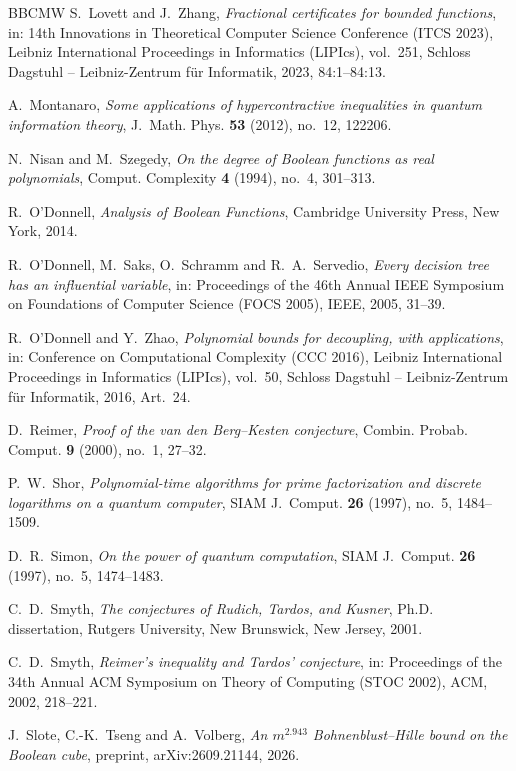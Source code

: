 \documentclass[11pt,reqno]{amsart}
\theoremstyle{definition}
\theoremstyle{remark}
\numberwithin{equation}{section}
\theoremstyle{named}
\theoremstyle{plain}
\begin{document}
\begin{thebibliography}{BBCMW}
 S.~Lovett and J.~Zhang, \emph{Fractional certificates for bounded functions}, in:
14th Innovations in Theoretical Computer Science Conference (ITCS 2023), Leibniz International
Proceedings in Informatics (LIPIcs), vol.~251, Schloss Dagstuhl -- Leibniz-Zentrum f\"ur Informatik,
2023, 84:1--84:13.

 A.~Montanaro, \emph{Some applications of hypercontractive inequalities in quantum
information theory}, J.~Math. Phys. \textbf{53} (2012), no.~12, 122206.

 N.~Nisan and M.~Szegedy, \emph{On the degree of Boolean functions as real
polynomials}, Comput. Complexity \textbf{4} (1994), no.~4, 301--313.

 R.~O'Donnell, \emph{Analysis of Boolean Functions}, Cambridge University Press,
New York, 2014.

 R.~O'Donnell, M.~Saks, O.~Schramm and R.~A.~Servedio, \emph{Every decision tree
has an influential variable}, in: Proceedings of the 46th Annual IEEE Symposium on Foundations of
Computer Science (FOCS 2005), IEEE, 2005, 31--39.

 R.~O'Donnell and Y.~Zhao, \emph{Polynomial bounds for decoupling, with applications},
in: Conference on Computational Complexity (CCC 2016), Leibniz International Proceedings in
Informatics (LIPIcs), vol.~50, Schloss Dagstuhl -- Leibniz-Zentrum f\"ur Informatik, 2016, Art.~24.

 D.~Reimer, \emph{Proof of the van den Berg--Kesten conjecture}, Combin. Probab.
Comput. \textbf{9} (2000), no.~1, 27--32.

 P.~W.~Shor, \emph{Polynomial-time algorithms for prime factorization and discrete
logarithms on a quantum computer}, SIAM J.~Comput. \textbf{26} (1997), no.~5, 1484--1509.

 D.~R.~Simon, \emph{On the power of quantum computation}, SIAM J.~Comput.
\textbf{26} (1997), no.~5, 1474--1483.

 C.~D.~Smyth, \emph{The conjectures of Rudich, Tardos, and Kusner}, Ph.D.
dissertation, Rutgers University, New Brunswick, New Jersey, 2001.

 C.~D.~Smyth, \emph{Reimer's inequality and Tardos' conjecture}, in:
Proceedings of the 34th Annual ACM Symposium on Theory of Computing (STOC 2002), ACM, 2002,
218--221.

 J.~Slote, C.-K.~Tseng and A.~Volberg, \emph{An $m^{2.943}$ Bohnenblust--Hille bound
on the Boolean cube}, preprint, arXiv:2609.21144, 2026.


\end{thebibliography}
\end{document}
